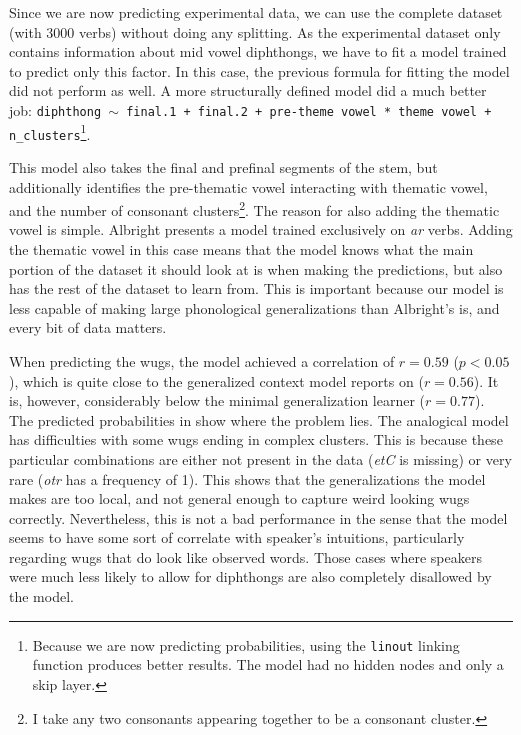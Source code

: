 Since we are now predicting experimental data, we can use the complete dataset (with 3000 verbs) without doing any splitting. As the experimental dataset only contains information about mid vowel diphthongs, we have to fit a model trained to predict only this factor. In this case, the previous formula for fitting the model did not perform as well. A more structurally defined model did a much better job: \texttt{diphthong $\sim$ final.1 + final.2 + pre-theme vowel * theme vowel + n\_clusters}\footnote{Because we are now predicting probabilities, using the \texttt{linout} linking function produces better results. The model had no hidden nodes and only a skip layer.}.

This model also takes the final and prefinal segments of the stem, but additionally identifies the pre-thematic vowel interacting with thematic vowel, and the number of consonant clusters\footnote{I take any two consonants appearing together to be a consonant cluster.}. The reason for also adding the thematic vowel is simple. Albright presents a model trained exclusively on \textit{ar} verbs. Adding the thematic vowel in this case means that the model knows what the main portion of the dataset it should look at is when making the predictions, but also has the rest of the dataset to learn from. This is important because our model is less capable of making large phonological generalizations than Albright's is, and every bit of data matters.

When predicting the wugs, the model achieved a correlation of $r=0.59$ ($p<0.05$), which is quite close to the generalized context model \textcite{Albright.2009} reports on ($r=0.56$). It is, however, considerably below the minimal generalization learner ($r=0.77$). The predicted probabilities in  show where the problem lies. The analogical model has difficulties with some wugs ending in complex clusters. This is because these particular combinations are either not present in the data (\textit{etC} is missing) or very rare (\textit{otr} has a frequency of 1). This shows that the generalizations the model makes are too local, and not general enough to capture weird looking wugs correctly. Nevertheless, this is not a bad performance in the sense that the model seems to have some sort of correlate with speaker's intuitions, particularly regarding wugs that do look like observed words. Those cases where speakers were much less likely to allow for diphthongs are also completely disallowed by the model.

